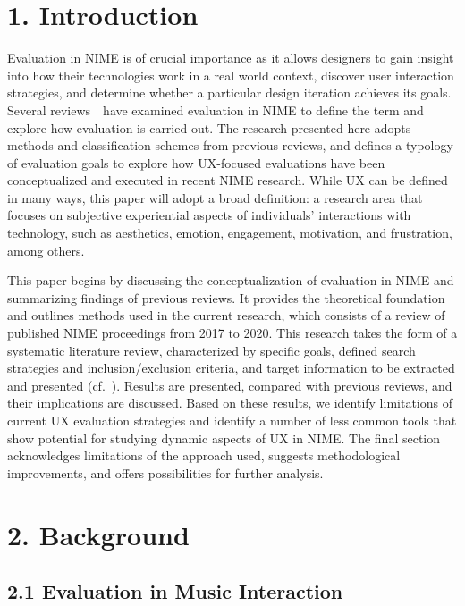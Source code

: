 \documentclass[sigconf]{nimeart}
\begin{document}
\section{1. Introduction}\label{introduction}

Evaluation in NIME is of crucial importance as it allows designers to gain insight into how their technologies work in a real world context, discover user interaction strategies, and determine whether a particular design iteration achieves its goals. Several reviews~\cite{c1,c2,c3,c4}~have examined evaluation in NIME to define the term and explore how evaluation is carried out. The research presented here adopts methods and classification schemes from previous reviews, and defines a typology of evaluation goals to explore how UX-focused evaluations have been conceptualized and executed in recent NIME research. While UX can be defined in many ways, this paper will adopt a broad definition: a research area that focuses on subjective experiential aspects of individuals' interactions with technology, such as aesthetics, emotion, engagement, motivation, and frustration, among others.

This paper begins by discussing the conceptualization of evaluation in NIME and summarizing findings of previous reviews. It provides the theoretical foundation and outlines methods used in the current research, which consists of a review of published NIME proceedings from 2017 to 2020. This research takes the form of a systematic literature review, characterized by specific goals, defined search strategies and inclusion/exclusion criteria, and target information to be extracted and presented (cf.~\cite{c5,c6}). Results are presented, compared with previous reviews, and their implications are discussed. Based on these results, we identify limitations of current UX evaluation strategies and identify a number of less common tools that show potential for studying dynamic aspects of UX in NIME. The final section acknowledges limitations of the approach used, suggests methodological improvements, and offers possibilities for further analysis.

\section{2. Background}\label{background}

\subsection{2.1 Evaluation in Music Interaction}\label{evaluation-in-music-interaction}
\end{document}
